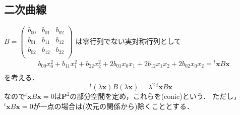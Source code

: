 \subsection{二次曲線}
$
	B=\begin{pmatrix}
    	    	b_{00}&b_{01}&b_{02}\\
    		b_{01}&b_{11}&b_{12}\\
    		b_{02}&b_{12}&b_{22}\\
 	\end{pmatrix}$
は零行列でない実対称行列として
\[
\begin{split}
	&b_{00}x_0^2+b_{11}x_1^2+b_{22}x_2^2 
	+ 2b_{01}x_0x_1+2b_{12}x_1x_2 +2b_{02}x_0x_2
	=
	{}^t\mathbf x B\mathbf x\\
\end{split}
\]
を考える．
\[
	{}^t(\lambda\mathbf x) B(\lambda\mathbf x)
	=
	\lambda^2\, {}^t\mathbf x B\mathbf x
\]
なので${}^t\mathbf x B\mathbf x=0$は$\mathbf P^2$の部分空間を定め，これらを(conic)という．
ただし，${}^t\mathbf x B\mathbf x=0$が一点の場合は(次元の関係から)除くこととする．

